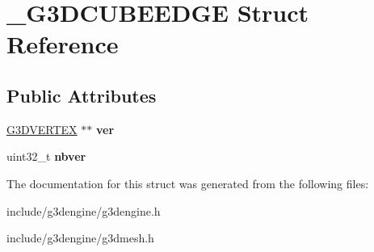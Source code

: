 \hypertarget{struct__G3DCUBEEDGE}{}\section{\+\_\+\+G3\+D\+C\+U\+B\+E\+E\+D\+GE Struct Reference}
\label{struct__G3DCUBEEDGE}
\subsection*{Public Attributes}
\begin{DoxyCompactItemize}
\item 
\mbox{\label{struct__G3DCUBEEDGE_ae10183b75991f8820ced246751dfcde6}} 
\hyperlink{struct__G3DVERTEX}{G3\+D\+V\+E\+R\+T\+EX} $\ast$$\ast$ {\bfseries ver}
\item 
\mbox{\label{struct__G3DCUBEEDGE_a20e0965e2c90e0887b9a5823def0bae7}} 
uint32\+\_\+t {\bfseries nbver}
\end{DoxyCompactItemize}


The documentation for this struct was generated from the following files\+:\begin{DoxyCompactItemize}
\item 
include/g3dengine/g3dengine.\+h\item 
include/g3dengine/g3dmesh.\+h\end{DoxyCompactItemize}
